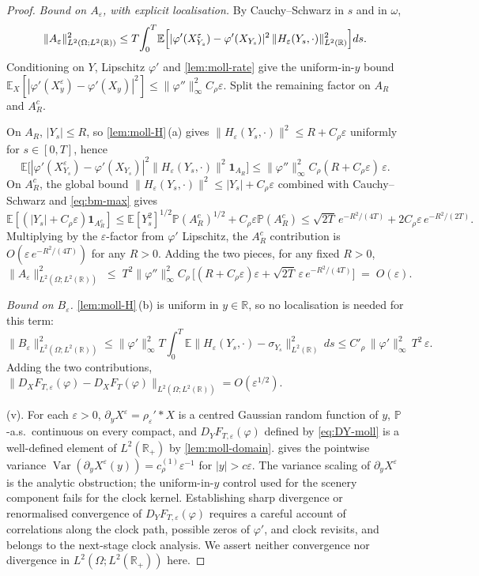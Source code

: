 \documentclass[11pt,reqno]{amsart}
\theoremstyle{plain}
\theoremstyle{definition}
\theoremstyle{remark}
\newcommand{\R}{\mathbb{R}}
\newcommand{\E}{\mathbb{E}}
\newcommand{\Prob}{\mathbb{P}}
\DeclareMathOperator{\Var}{Var}
\begin{document}
\begin{proof}
\emph{Bound on $A_\varepsilon$, with explicit localisation.} By
Cauchy--Schwarz in $s$ and in $\omega$,
\[
  \|A_\varepsilon\|_{L^{2}(\Omega;L^{2}(\R))}^{2}
  \le T\!\int_0^T\!\E\Bigl[
       |\varphi'(X^\varepsilon_{Y_s})-\varphi'(X_{Y_s})|^{2}\,
       \|H_\varepsilon(Y_s,\cdot)\|_{L^{2}(\R)}^{2}\Bigr]ds.
\]
Conditioning on $Y$, Lipschitz $\varphi'$ and \cref{lem:moll-rate} give
the uniform-in-$y$ bound
$\E_X[|\varphi'(X^\varepsilon_y)-\varphi'(X_y)|^{2}]\le
\|\varphi''\|_\infty^{2}C_\rho\varepsilon$. Split the remaining factor
on $A_R$ and $A_R^{c}$.

On $A_R$, $|Y_s|\le R$, so \cref{lem:moll-H}\,(a) gives
$\|H_\varepsilon(Y_s,\cdot)\|^{2}\le R+C_\rho\varepsilon$ uniformly for
$s\in[0,T]$, hence
\[
  \E\bigl[|\varphi'(X^\varepsilon_{Y_s})-\varphi'(X_{Y_s})|^{2}
   \|H_\varepsilon(Y_s,\cdot)\|^{2}\mathbf 1_{A_R}\bigr]
  \le\|\varphi''\|_\infty^{2}C_\rho(R+C_\rho\varepsilon)\,\varepsilon.
\]
On $A_R^{c}$, the global bound $\|H_\varepsilon(Y_s,\cdot)\|^{2}\le
|Y_s|+C_\rho\varepsilon$ combined with Cauchy--Schwarz and
\eqref{eq:bm-max} gives
\[
  \E[(|Y_s|+C_\rho\varepsilon)\mathbf 1_{A_R^{c}}]
  \le\E[Y_s^{2}]^{1/2}\Prob(A_R^{c})^{1/2}+C_\rho\varepsilon\Prob(A_R^{c})
  \le\sqrt{2T}\,e^{-R^{2}/(4T)}+2C_\rho\varepsilon\,e^{-R^{2}/(2T)}.
\]
Multiplying by the $\varepsilon$-factor from $\varphi'$ Lipschitz, the
$A_R^{c}$ contribution is $O(\varepsilon\,e^{-R^{2}/(4T)})$ for any
$R>0$. Adding the two pieces, for any fixed $R>0$,
\[
  \|A_\varepsilon\|_{L^{2}(\Omega;L^{2}(\R))}^{2}
  \;\le\;T^{2}\|\varphi''\|_\infty^{2}C_\rho\,
   \bigl[(R+C_\rho\varepsilon)\varepsilon
       +\sqrt{2T}\,\varepsilon\,e^{-R^{2}/(4T)}\bigr]
  \;=\;O(\varepsilon).
\]

\emph{Bound on $B_\varepsilon$.} \cref{lem:moll-H}\,(b) is uniform in
$y\in\R$, so no localisation is needed for this term:
\[
  \|B_\varepsilon\|_{L^{2}(\Omega;L^{2}(\R))}^{2}
  \le\|\varphi'\|_\infty^{2}T\!\int_0^T\!
       \E\|H_\varepsilon(Y_s,\cdot)-\sigma_{Y_s}\|_{L^{2}(\R)}^{2}\,ds
  \le C'_\rho\,\|\varphi'\|_\infty^{2}\,T^{2}\,\varepsilon.
\]
Adding the two contributions,
$\|D_X F_{T,\varepsilon}(\varphi)-D_X F_T(\varphi)\|_{L^{2}(\Omega;L^{2}(\R))}
=O(\varepsilon^{1/2})$.

(v). For each $\varepsilon>0$, $\partial_yX^\varepsilon=\rho_\varepsilon'*X$
is a centred Gaussian random function of $y$, $\Prob$-a.s.\ continuous
on every compact, and $D_Y F_{T,\varepsilon}(\varphi)$ defined by
\eqref{eq:DY-moll} is a well-defined element of $L^{2}(\R_{+})$ by
\cref{lem:moll-domain}.  gives the pointwise
variance $\Var(\partial_yX^\varepsilon(y))=c_\rho^{(1)}\varepsilon^{-1}$
for $|y|>c\varepsilon$. The variance scaling of $\partial_yX^\varepsilon$
is the analytic obstruction; the uniform-in-$y$ control used for the
scenery component fails for the clock kernel. Establishing sharp
divergence or renormalised convergence of
$D_Y F_{T,\varepsilon}(\varphi)$ requires a careful account of
correlations along the clock path, possible zeros of $\varphi'$, and
clock revisits, and belongs to the next-stage clock analysis. We assert
neither convergence nor divergence in $L^{2}(\Omega;L^{2}(\R_{+}))$ here.
\end{proof}
\end{document}
